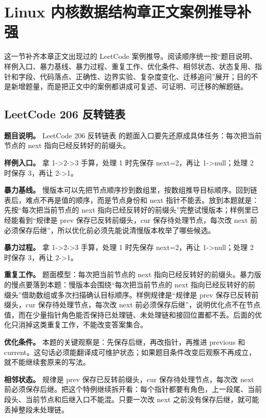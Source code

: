 \section{Linux 内核数据结构章正文案例推导补强}

这一节补齐本章正文出现过的 LeetCode 案例推导。阅读顺序统一按“题目说明、样例入口、暴力基线、暴力过程、重复工作、优化条件、相邻状态、状态复用、指针和字段、代码落点、正确性、边界实验、复杂度变化、迁移追问”展开；目的不是新增题量，而是把正文中的案例都讲成可复述、可证明、可迁移的解题链。

\subsection{LeetCode 206 反转链表}

\textbf{题目说明。} LeetCode 206 反转链表 的题面入口要先还原成具体任务：每次把当前节点的 next 指向已经反转好的前缀头。

\textbf{样例入口。} 拿 1->2->3 手算，处理 1 时先保存 next=2，再让 1->null；处理 2 时保存 3，再让 2->1。

\textbf{暴力基线。} 慢版本可以先把节点顺序抄到数组里，按数组推导目标顺序。回到链表后，难点不再是值的顺序，而是节点身份和 next 指针不能丢。放到本题就是：先按“每次把当前节点的 next 指向已经反转好的前缀头”完整试慢版本；样例里已经能看到“规律是 prev 保存已反转前缀头，cur 保存待处理节点，每次改 next 前必须保存后继”，所以优化前必须先能说清慢版本枚举了哪些候选。

\textbf{暴力过程。} 拿 1->2->3 手算，处理 1 时先保存 next=2，再让 1->null；处理 2 时保存 3，再让 2->1。

\textbf{重复工作。} 题面模型：每次把当前节点的 next 指向已经反转好的前缀头。暴力版的慢点要落到本题：慢版本会围绕“每次把当前节点的 next 指向已经反转好的前缀头”借助数组或多次扫描确认目标顺序。样例规律是“规律是 prev 保存已反转前缀头，cur 保存待处理节点，每次改 next 前必须保存后继”，说明优化点不在节点值，而在少量指针角色能否保持已处理链、未处理链和接回位置都不丢。后面的优化只消掉这类重复工作，不能改变答案集合。

\textbf{优化条件。} 本题的关键观察是：先保存后继，再改指针，再推进 previous 和 current。这句话必须能翻译成可维护状态；如果题目条件改变后观察不再成立，就不能继续套原来的写法。

\textbf{相邻状态。} 规律是 prev 保存已反转前缀头，cur 保存待处理节点，每次改 next 前必须保存后继。把这个特例继续拆开看：每个指针都要有角色，上一段尾、当前段头、当前节点和后继入口不能混。只要一次改 next 之前没有保存后继，就可能丢掉整段未处理链。

